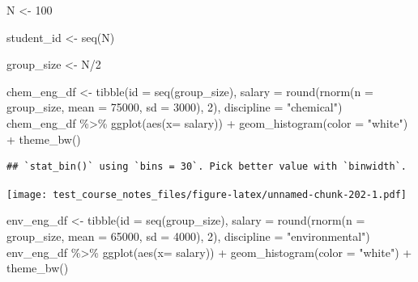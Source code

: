 \documentclass[
]{book}
\newenvironment{Shaded}{\begin{snugshade}}{\end{snugshade}}
\newcommand{\AttributeTok}[1]{\textcolor[rgb]{0.77,0.63,0.00}{#1}}
\newcommand{\DecValTok}[1]{\textcolor[rgb]{0.00,0.00,0.81}{#1}}
\newcommand{\FunctionTok}[1]{\textcolor[rgb]{0.00,0.00,0.00}{#1}}
\newcommand{\NormalTok}[1]{#1}
\newcommand{\OtherTok}[1]{\textcolor[rgb]{0.56,0.35,0.01}{#1}}
\newcommand{\SpecialCharTok}[1]{\textcolor[rgb]{0.00,0.00,0.00}{#1}}
\newcommand{\StringTok}[1]{\textcolor[rgb]{0.31,0.60,0.02}{#1}}
\begin{document}
\begin{Shaded}
\begin{Highlighting}[]
\NormalTok{N }\OtherTok{\textless{}{-}} \DecValTok{100}

\NormalTok{student\_id }\OtherTok{\textless{}{-}} \FunctionTok{seq}\NormalTok{(N)}

\NormalTok{group\_size }\OtherTok{\textless{}{-}}\NormalTok{ N}\SpecialCharTok{/}\DecValTok{2}

\NormalTok{chem\_eng\_df }\OtherTok{\textless{}{-}} \FunctionTok{tibble}\NormalTok{(}\AttributeTok{id =} \FunctionTok{seq}\NormalTok{(group\_size),}
                      \AttributeTok{salary =} \FunctionTok{round}\NormalTok{(}\FunctionTok{rnorm}\NormalTok{(}\AttributeTok{n =}\NormalTok{ group\_size, }\AttributeTok{mean =} \DecValTok{75000}\NormalTok{, }\AttributeTok{sd =} \DecValTok{3000}\NormalTok{), }\DecValTok{2}\NormalTok{),}
                      \AttributeTok{discipline =} \StringTok{"chemical"}\NormalTok{)}
\NormalTok{chem\_eng\_df }\SpecialCharTok{\%\textgreater{}\%} 
  \FunctionTok{ggplot}\NormalTok{(}\FunctionTok{aes}\NormalTok{(}\AttributeTok{x=}\NormalTok{ salary)) }\SpecialCharTok{+}
  \FunctionTok{geom\_histogram}\NormalTok{(}\AttributeTok{color =} \StringTok{"white"}\NormalTok{) }\SpecialCharTok{+}
  \FunctionTok{theme\_bw}\NormalTok{()}
\end{Highlighting}
\end{Shaded}

\begin{verbatim}
## `stat_bin()` using `bins = 30`. Pick better value with `binwidth`.
\end{verbatim}

\texttt{[image: test\_course\_notes\_files/figure-latex/unnamed-chunk-202-1.pdf]}

\begin{Shaded}
\begin{Highlighting}[]
\NormalTok{env\_eng\_df }\OtherTok{\textless{}{-}} \FunctionTok{tibble}\NormalTok{(}\AttributeTok{id =} \FunctionTok{seq}\NormalTok{(group\_size),}
                      \AttributeTok{salary =} \FunctionTok{round}\NormalTok{(}\FunctionTok{rnorm}\NormalTok{(}\AttributeTok{n =}\NormalTok{ group\_size, }\AttributeTok{mean =} \DecValTok{65000}\NormalTok{, }\AttributeTok{sd =} \DecValTok{4000}\NormalTok{), }\DecValTok{2}\NormalTok{),}
                      \AttributeTok{discipline =} \StringTok{"environmental"}\NormalTok{)}
\NormalTok{env\_eng\_df }\SpecialCharTok{\%\textgreater{}\%} 
  \FunctionTok{ggplot}\NormalTok{(}\FunctionTok{aes}\NormalTok{(}\AttributeTok{x=}\NormalTok{ salary)) }\SpecialCharTok{+}
  \FunctionTok{geom\_histogram}\NormalTok{(}\AttributeTok{color =} \StringTok{"white"}\NormalTok{) }\SpecialCharTok{+}
  \FunctionTok{theme\_bw}\NormalTok{()}
\end{Highlighting}
\end{Shaded}
\end{document}
